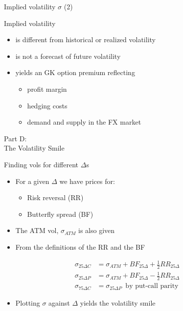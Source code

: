 \documentclass[ignorenonframetext,aspectratio=169]{beamer}
\providecommand{\tightlist}{%
  \setlength{\itemsep}{0pt}\setlength{\parskip}{0pt}}
\begin{document}
\begin{frame}{Implied volatility \(\sigma\) (2)}

Implied volatility

\begin{itemize}
\tightlist
\item
  is different from historical or realized volatility\\[2\baselineskip]
\item
  is not a forecast of future volatility\\[2\baselineskip]
\item
  yields an GK option premium reflecting

  \begin{itemize}
  \tightlist
  \item
    profit margin
  \item
    hedging costs
  \item
    demand and supply in the FX market
  \end{itemize}
\end{itemize}

\end{frame}

\begin{frame}{}

\color{blue} \LARGE{Part D:}\\
\LARGE{The Volatility Smile}

\end{frame}

\begin{frame}{Finding vols for different \(\Delta\)s}

\begin{itemize}
\item
  For a given \(\Delta\) we have prices for:

  \begin{itemize}
  \tightlist
  \item
    Risk reversal (RR)
  \item
    Butterfly spread (BF)
  \end{itemize}
\item
  The ATM vol, \(\sigma_{ATM}\) is also given
\item
  From the definitions of the RR and the BF
\end{itemize}

\[
\begin{aligned}
  \sigma_{25\Delta C} &= \sigma_{ATM} + BF_{25\Delta} + \frac{1}{2} RR_{25\Delta}\\
  \sigma_{25\Delta P} &= \sigma_{ATM} + BF_{25\Delta} - \frac{1}{2} RR_{25\Delta}\\
  \sigma_{75\Delta C} &= \sigma_{25\Delta P}\enspace \text{by put-call parity}
\end{aligned}
\]

\begin{itemize}
\tightlist
\item
  Plotting \(\sigma\) against \(\Delta\) yields the volatility smile
\end{itemize}

\end{frame}
\end{document}
